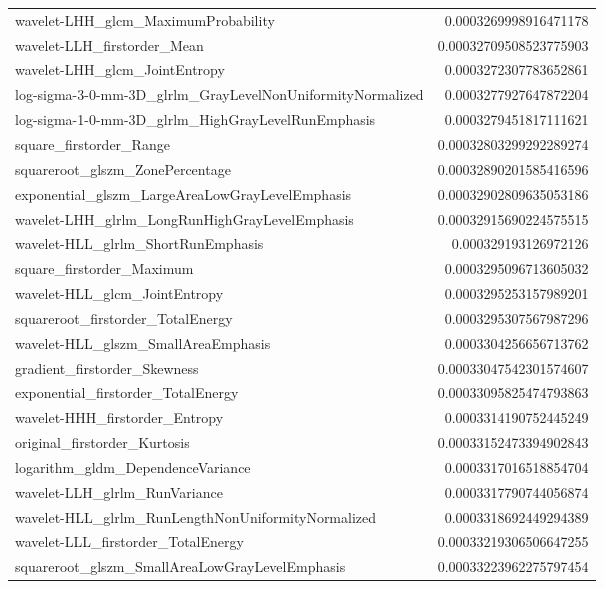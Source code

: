 {\begin{xltabular}[H]{\textwidth}{X r}
        wavelet-LHH\_glcm\_MaximumProbability & 0.0003269998916471178 \\
        wavelet-LLH\_firstorder\_Mean & 0.00032709508523775903 \\
        wavelet-LHH\_glcm\_JointEntropy & 0.0003272307783652861 \\
        log-sigma-3-0-mm-3D\_glrlm\_GrayLevelNonUniformityNormalized & 0.0003277927647872204 \\
        log-sigma-1-0-mm-3D\_glrlm\_HighGrayLevelRunEmphasis & 0.0003279451817111621 \\
        square\_firstorder\_Range & 0.00032803299292289274 \\
        squareroot\_glszm\_ZonePercentage & 0.00032890201585416596 \\
        exponential\_glszm\_LargeAreaLowGrayLevelEmphasis & 0.00032902809635053186 \\
        wavelet-LHH\_glrlm\_LongRunHighGrayLevelEmphasis & 0.00032915690224575515 \\
        wavelet-HLL\_glrlm\_ShortRunEmphasis & 0.000329193126972126 \\
        square\_firstorder\_Maximum & 0.0003295096713605032 \\
        wavelet-HLL\_glcm\_JointEntropy & 0.0003295253157989201 \\
        squareroot\_firstorder\_TotalEnergy & 0.0003295307567987296 \\
        wavelet-HLL\_glszm\_SmallAreaEmphasis & 0.0003304256656713762 \\
        gradient\_firstorder\_Skewness & 0.00033047542301574607 \\
        exponential\_firstorder\_TotalEnergy & 0.00033095825474793863 \\
        wavelet-HHH\_firstorder\_Entropy & 0.0003314190752445249 \\
        original\_firstorder\_Kurtosis & 0.00033152473394902843 \\
        logarithm\_gldm\_DependenceVariance & 0.0003317016518854704 \\
        wavelet-LLH\_glrlm\_RunVariance & 0.0003317790744056874 \\
        wavelet-HLL\_glrlm\_RunLengthNonUniformityNormalized & 0.0003318692449294389 \\
        wavelet-LLL\_firstorder\_TotalEnergy & 0.00033219306506647255 \\
        squareroot\_glszm\_SmallAreaLowGrayLevelEmphasis & 0.00033223962275797454 \\

\end{xltabular}}
